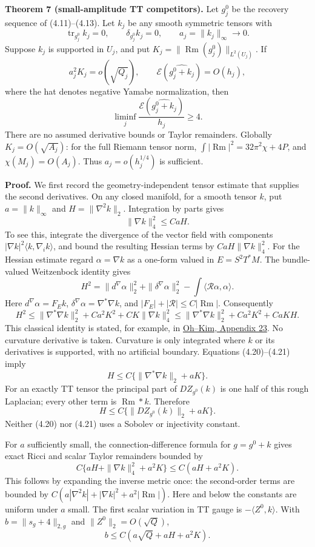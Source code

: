 \documentclass[
  11pt,
]{article}
\begin{document}
\textbf{Theorem 7 (small-amplitude TT competitors).} Let \(g_j^0\) be
the recovery sequence of (4.11)--(4.13). Let \(k_j\) be any smooth
symmetric tensors with \[
 \operatorname{tr}_{g_j^0}k_j=0,\qquad
 \delta_{g_j^0}k_j=0,\qquad a_j=\|k_j\|_\infty\longrightarrow0.
\] Suppose \(k_j\) is supported in \(U_j\), and put
\(K_j=\|\operatorname{Rm}(g_j^0)\|_{L^2(U_j)}\). If \[
 a_j^2 K_j=o(\sqrt{Q_j}),\qquad
 \mathcal E(\widehat{g_j^0+k_j})=O(h_j),
 \tag{4.18}
\] where the hat denotes negative Yamabe normalization, then \[
 \boxed{\liminf_j
     \frac{\mathcal E(\widehat{g_j^0+k_j})}{h_j}\ge4.} \tag{4.19}
\] There are no assumed derivative bounds or Taylor remainders. Globally
\(K_j=O(\sqrt{A_j})\): for the full Riemann tensor norm,
\(\int|\operatorname{Rm}|^2=32\pi^2\chi+4P\), and \(\chi(M_j)=O(A_j)\).
Thus \(a_j=o(h_j^{1/4})\) is sufficient.

\textbf{Proof.} We first record the geometry-independent tensor estimate
that supplies the second derivatives. On any closed manifold, for a
smooth tensor \(k\), put \(a=\|k\|_\infty\) and \(H=\|\nabla^2k\|_2\).
Integration by parts gives \[
 \|\nabla k\|_4^2\le CaH. \tag{4.20}
\] To see this, integrate the divergence of the vector field with
components \(|\nabla k|^2\langle k,\nabla_i k\rangle\), and bound the
resulting Hessian terms by \(CaH\|\nabla k\|_4^2\). For the Hessian
estimate regard \(\alpha=\nabla k\) as a one-form valued in
\(E=S^2T^*M\). The bundle-valued Weitzenbock identity gives \[
 H^2=\|d^\nabla\alpha\|_2^2+
        \|\delta^\nabla\alpha\|_2^2
                -\int\langle\mathcal R\alpha,\alpha\rangle.
\] Here \(d^\nabla\alpha=F_Ek\),
\(\delta^\nabla\alpha=\nabla^*\nabla k\), and
\(|F_E|+|\mathcal R|\le C|\operatorname{Rm}|\). Consequently \[
 H^2\le\|\nabla^*\nabla k\|_2^2+Ca^2K^2
            +CK\|\nabla k\|_4^2
       \le\|\nabla^*\nabla k\|_2^2+Ca^2K^2+CaKH.
 \tag{4.21}
\] This classical identity is stated, for example, in
\href{https://www.matrix-inst.org.au/wp_Matrix2016/wp-content/uploads/2023/07/OhKim.pdf}{Oh--Kim,
Appendix 23}. No curvature derivative is taken. Curvature is only
integrated where \(k\) or its derivatives is supported, with no
artificial boundary. Equations (4.20)--(4.21) imply \[
 H\le C\{\|\nabla^*\nabla k\|_2+aK\}.
\] For an exactly TT tensor the principal part of \(DZ_{g^0}(k)\) is one
half of this rough Laplacian; every other term is
\(\operatorname{Rm}*k\). Therefore \[
 H\le C\{\|DZ_{g^0}(k)\|_2+aK\}. \tag{4.22}
\] Neither (4.20) nor (4.21) uses a Sobolev or injectivity constant.

For \(a\) sufficiently small, the connection-difference formula for
\(g=g^0+k\) gives exact Ricci and scalar Taylor remainders bounded by \[
 C\{aH+\|\nabla k\|_4^2+a^2K\}
 \le C(aH+a^2K). \tag{4.23}
\] This follows by expanding the inverse metric once: the second-order
terms are bounded by
\(C(a|\nabla^2k|+|\nabla k|^2+a^2|\operatorname{Rm}|)\). Here and below
the constants are uniform under \(a\) small. The first scalar variation
in TT gauge is \(-\langle Z^0,k\rangle\). With \(b=\|s_g+4\|_{2,g}\) and
\(\|Z^0\|_2=O(\sqrt Q)\), \[
 b\le C(a\sqrt Q+aH+a^2K). \tag{4.24}
\]
\end{document}
